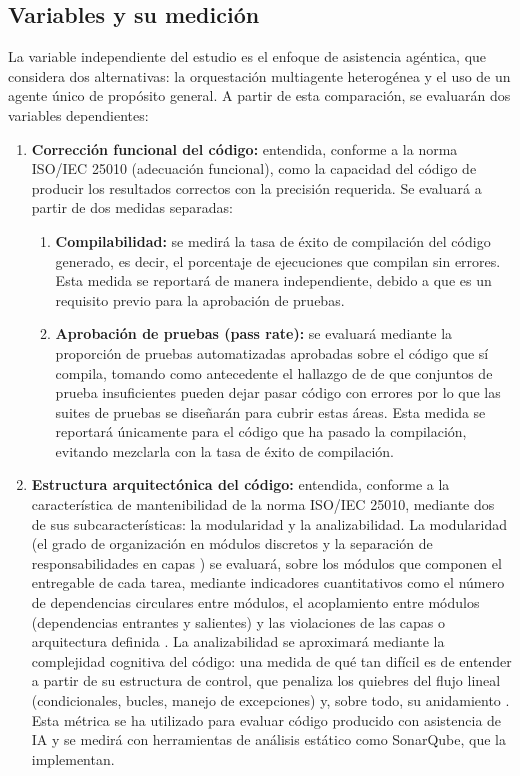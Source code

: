 \subsection{Variables y su medición}
\label{subsec:variables-medicion}

La variable independiente del estudio es el enfoque de asistencia agéntica, que considera dos alternativas: la orquestación multiagente heterogénea y el uso de un agente único de propósito general. A partir de esta comparación, se evaluarán dos variables dependientes:

\begin{enumerate}

  \item \textbf{Corrección funcional del código:} entendida, conforme a la norma ISO/IEC 25010 (adecuación funcional), como la capacidad del código de producir los resultados correctos con la precisión requerida. Se evaluará a partir de dos medidas separadas:
  \begin{enumerate}
    \item \textbf{Compilabilidad:} se medirá la tasa de éxito de compilación del código generado, es decir, el porcentaje de ejecuciones que compilan sin errores. Esta medida se reportará de manera independiente, debido a que es un requisito previo para la aprobación de pruebas.
    \item \textbf{Aprobación de pruebas (pass rate):} se evaluará mediante la proporción de pruebas automatizadas aprobadas sobre el código que sí compila, tomando como antecedente el hallazgo de \textcite{liu2023evalplus} de que conjuntos de prueba insuficientes pueden dejar pasar código con errores por lo que las suites de pruebas se diseñarán para cubrir estas áreas. Esta medida se reportará únicamente para el código que ha pasado la compilación, evitando mezclarla con la tasa de éxito de compilación.
  \end{enumerate}

  \item \textbf{Estructura arquitectónica del código:} entendida, conforme a la característica de mantenibilidad de la norma ISO/IEC 25010, mediante dos de sus subcaracterísticas: la modularidad y la analizabilidad. La modularidad (el grado de organización en módulos discretos y la separación de responsabilidades en capas \parencite{donato2026rolebased}) se evaluará, sobre los módulos que componen el entregable de cada tarea, mediante indicadores cuantitativos como el número de dependencias circulares entre módulos, el acoplamiento entre módulos (dependencias entrantes y salientes) y las violaciones de las capas o arquitectura definida \parencite{sarkar2008modularization}. La analizabilidad se aproximará mediante la complejidad cognitiva del código: una medida de qué tan difícil es de entender a partir de su estructura de control, que penaliza los quiebres del flujo lineal (condicionales, bucles, manejo de excepciones) y, sobre todo, su anidamiento \parencite{campbell2018cognitive}. Esta métrica se ha utilizado para evaluar código producido con asistencia de IA \parencite{agarwal2026codingagents} y se medirá con herramientas de análisis estático como SonarQube, que la implementan.
\end{enumerate}

